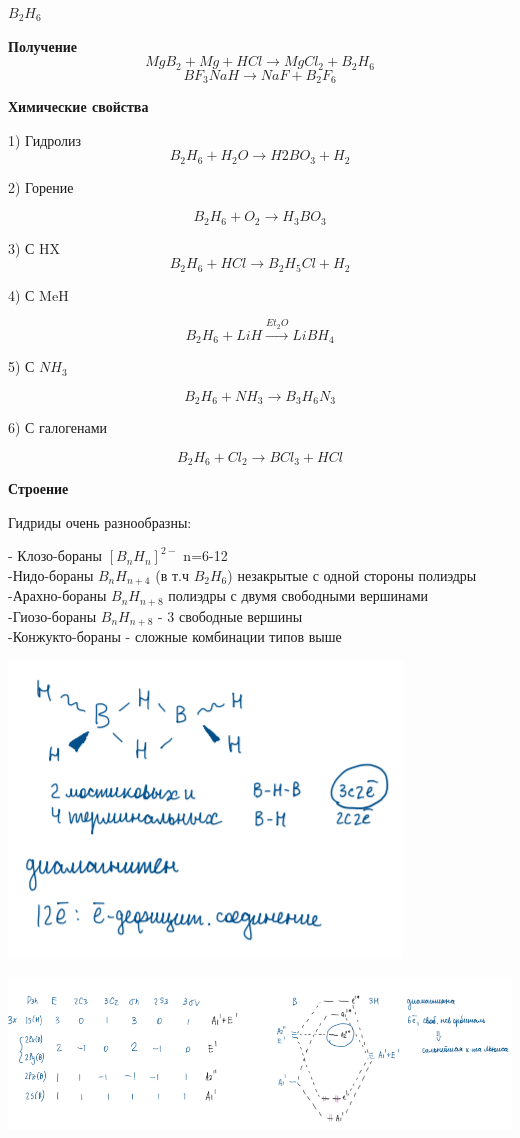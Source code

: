 \documentclass[14pt,a4paper]{scrartcl}
\begin{document}
$B_2H_6$

\textbf{Получение}
$$MgB_2 + Mg + HCl \rightarrow MgCl_2 + B_2H_6$$
$$BF_3 NaH \rightarrow NaF + B_2F_6$$

\textbf{Химические свойства}

1) Гидролиз 
$$B_2H_6 + H_2O \rightarrow H2BO_3 + H_2$$

2) Горение

$$B_2H_6  + O_2 \rightarrow H_3BO_3$$

3) С HX
$$B_2H_6 + HCl \rightarrow B_2H_5Cl + H_2$$

4) С MeH

$$B_2H_6 + LiH \xrightarrow{Et_2O} LiBH_4$$

5) С $NH_3$

$$B_2H_6 + NH_3 \rightarrow B_3H_6N_3$$

6) С галогенами

$$B_2H_6 + Cl_2 \rightarrow BCl_3 + HCl$$

\textbf{Строение}

Гидриды очень разнообразны:

- Клозо-бораны $[B_nH_n]^{2-}$ n=6-12\\
-Нидо-бораны $B_nH_{n+4}$ (в т.ч $B_2H_6$) незакрытые с одной стороны полиэдры\\
-Арахно-бораны $B_nH_{n+8}$ полиэдры с двумя свободными вершинами\\
-Гиозо-бораны $B_nH_{n+8}$ - 3 свободные вершины\\
-Конжукто-бораны  - сложные комбинации типов выше

\includegraphics{11v2.png}

\includegraphics{11v3.png}
\end{document}
